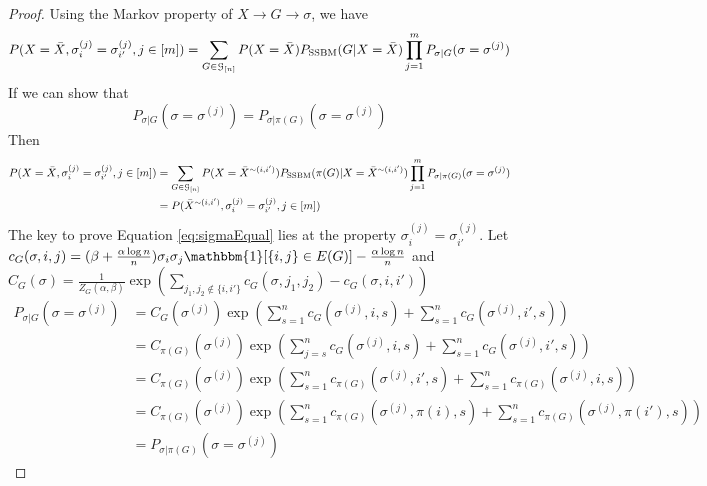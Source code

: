 \documentclass{article}
\begin{document}
\begin{proof}
Using the Markov property of $X \to G \to \sigma$, we have
\begin{align*}
P(X=\bar{X}, \sigma_i^{(j)} = \sigma_{i'}^{(j)}, j\in[m]) & = \sum_{G \in \mathcal{G}_{[n]}} P(X=\bar{X}) P_{\operatorname{SSBM}}(G  | X = \bar{X})\prod_{j=1}^m P_{\sigma | G}(\sigma =\sigma^{(j)})\\
\end{align*}
If we can show that 
\begin{equation}\label{eq:sigmaEqual}
P_{\sigma | G}(\sigma =\sigma^{(j)}) = P_{\sigma | \pi(G)}(\sigma =\sigma^{(j)})
\end{equation}
Then 
\begin{align*}
P(X=\bar{X}, \sigma_i^{(j)} = \sigma_{i'}^{(j)}, j\in[m]) & = \sum_{G \in \mathcal{G}_{[n]}} P(X=\bar{X}^{\sim(i,i')}) P_{\operatorname{SSBM}}(\pi(G)  | X = \bar{X}^{\sim(i,i')})\prod_{j=1}^m P_{\sigma | \pi(G)}(\sigma =\sigma^{(j)})\\
& = P(\bar{X}^{\sim(i,i')}, \sigma_i^{(j)} = \sigma_{i'}^{(j)}, j\in[m])
\end{align*}
The key to prove Equation \eqref{eq:sigmaEqual} lies at the property $\sigma^{(j)}_i = \sigma^{(j)}_{i'}$.
Let $c_G(\sigma, i,j) = (\beta + \frac{\alpha \log n}{n})\sigma_i \sigma_j \mathbbm{1}[\{i,j\}\in E(G)]  - \frac{\alpha \log n}{n}$
and $C_G(\sigma) = \frac{1}{Z_G(\alpha, \beta)}\exp(\sum_{j_1, j_2 \not\in \{i,i'\}} c_G(\sigma, j_1, j_2) - c_G(\sigma, i,i'))$
\begin{align*}
P_{\sigma | G}(\sigma =\sigma^{(j)}) & = C_G(\sigma^{(j)})\exp(\sum_{s=1}^n c_G(\sigma^{(j)}, i, s)
+ \sum_{s=1}^n c_G(\sigma^{(j)}, i',s) ) \\
& = C_{\pi(G)}(\sigma^{(j)})\exp(\sum_{j=s}^n c_G(\sigma^{(j)}, i, s)
+ \sum_{s=1}^n c_G(\sigma^{(j)}, i',s) ) \\
& = C_{\pi(G)}(\sigma^{(j)})\exp(\sum_{s=1}^n c_{\pi(G)}(\sigma^{(j)}, i', s)+ \sum_{s=1}^n c_{\pi(G)}(\sigma^{(j)}, i, s) ) \\
& = C_{\pi(G)}(\sigma^{(j)})\exp(\sum_{s=1}^n c_{\pi(G)}(\sigma^{(j)}, \pi(i), s) + \sum_{s=1}^n c_{\pi(G)}(\sigma^{(j)}, \pi(i'), s) ) \\
& = P_{\sigma | \pi(G)}(\sigma =\sigma^{(j)})
\end{align*}
\end{proof}
\end{document}

